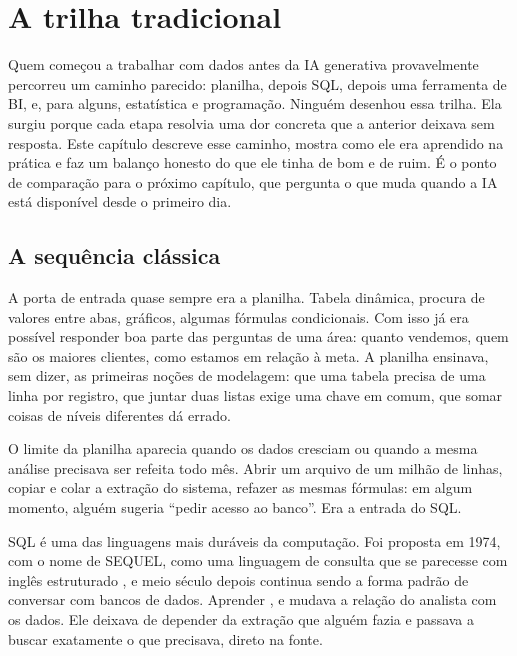 \chapter{A trilha tradicional}
\label{cap:trilha-tradicional}

Quem começou a trabalhar com dados antes da IA generativa provavelmente percorreu um
caminho parecido: planilha, depois SQL, depois uma ferramenta de BI, e, para alguns,
estatística e programação. Ninguém desenhou essa trilha. Ela surgiu porque cada etapa
resolvia uma dor concreta que a anterior deixava sem resposta. Este capítulo descreve
esse caminho, mostra como ele era aprendido na prática e faz um balanço honesto do que
ele tinha de bom e de ruim. É o ponto de comparação para o próximo capítulo, que
pergunta o que muda quando a IA está disponível desde o primeiro dia.

\section{A sequência clássica}
\label{sec:sequencia-classica}

A porta de entrada quase sempre era a planilha. Tabela dinâmica, procura de valores entre
abas, gráficos, algumas fórmulas condicionais. Com isso já era possível responder boa parte
das perguntas de uma área: quanto vendemos, quem são os maiores clientes, como estamos em
relação à meta. A planilha ensinava, sem dizer, as primeiras noções de modelagem: que uma
tabela precisa de uma linha por registro, que juntar duas listas exige uma chave em comum,
que somar coisas de níveis diferentes dá errado.

O limite da planilha aparecia quando os dados cresciam ou quando a mesma análise precisava
ser refeita todo mês. Abrir um arquivo de um milhão de linhas, copiar e colar a extração do
sistema, refazer as mesmas fórmulas: em algum momento, alguém sugeria \enquote{pedir
acesso ao banco}. Era a entrada do SQL.

SQL é uma das linguagens mais duráveis da computação. Foi proposta em 1974, com o nome de
SEQUEL, como uma linguagem de consulta que se parecesse com inglês estruturado
\parencite{chamberlin1974}, e meio século depois continua sendo a forma padrão de conversar
com bancos de dados. Aprender ,  e  mudava a
relação do analista com os dados. Ele deixava de depender da extração que alguém fazia e
passava a buscar exatamente o que precisava, direto na fonte.

